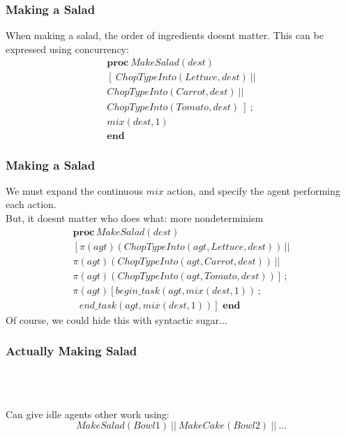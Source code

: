 \documentclass{beamer}
\begin{document}
\begin{frame}
\frametitle{Making a Salad}
When making a salad, the order of ingredients doesnt matter.  This can
be expressed using concurrency:\[
\begin{array}{c}
\mathbf{proc}\ MakeSalad(dest)\\
\left[\ ChopTypeInto(Lettuce,dest)\ ||\right.\\
ChopTypeInto(Carrot,dest)\ ||\\
\left.ChopTypeInto(Tomato,dest)\ \right]\ ;\\
mix(dest,1)\\
\mathbf{end}\end{array}\]
\end{frame}

\begin{frame}
\frametitle{Making a Salad}
We must expand the continuous $mix$ action, and specify the agent performing
each action.
\ \\
\pause
But, it doesnt matter who does what: more nondeterminism
\[
\begin{array}{c}
\mathbf{proc}\, MakeSalad(dest)\\
\left[\pi(agt)(ChopTypeInto(agt,Lettuce,dest))\,||\right.\\
\pi(agt)(ChopTypeInto(agt,Carrot,dest))\,||\\
\left.\pi(agt)(ChopTypeInto(agt,Tomato,dest))\right]\,;\\
\pi(agt)\left[begin\_task(agt,mix(dest,1))\,;\right.\\
\left.\,\,\,\, end\_task(agt,mix(dest,1))\right]\,\,\mathbf{end}\end{array}\]
Of course, we could hide this with syntactic sugar...
\end{frame}

\begin{frame}
\frametitle{Actually Making Salad}
\begin{columns}
  \begin{column}{0.5\textwidth}
  \end{column}
  \begin{column}{0.5\textwidth}
  \end{column}
\end{columns}
\ \\
\ \\
\pause
Can give idle agents other work using:\[
MakeSalad(Bowl1)\ ||\ MakeCake(Bowl2)\ ||\ \dots\]
\end{frame}
\end{document}

